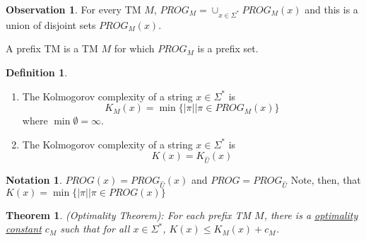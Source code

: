 \documentclass[12pt]{article}
\newtheorem{theorem}{Theorem}[section]
\theoremstyle{definition}
\newtheorem*{definition}{Definition}
\newtheorem*{observation}{Observation}
\newtheorem*{notation}{Notation}
\begin{document}
\begin{observation}
    For every TM $M$, $PROG_M = \cup_{x \in \Sigma^*} PROG_M(x)$ and this is a union of disjoint sets $PROG_M(x)$.

    A prefix TM is a TM $M$ for which $PROG_M$ is a prefix set.
\end{observation}

\begin{definition}
    \begin{enumerate}
        \item The Kolmogorov complexity of a string $x \in \Sigma^*$ is $$K_M(x) = \min \{|\pi| \vert \pi \in PROG_M(x)\}$$ where $\min \emptyset = \infty$.
        \item The Kolmogorov complexity of a string $x \in \Sigma^*$ is $$K(x) = K_{\hat U}(x)$$
    \end{enumerate}
\end{definition}

\begin{notation}
    $PROG(x) = PROG_{\hat U}(x)$ and $PROG = PROG_{\hat U}$ Note, then, that $K(x) = \min \{|\pi| \vert \pi \in PROG(x)\}$
\end{notation}

\begin{theorem}
    (Optimality Theorem): For each prefix TM $M$, there is a \underline{optimality constant} $c_M$ such that for all $x \in \Sigma^*$, $K(x) \leq K_M(x) + c_M$.
\end{theorem}
\end{document}

